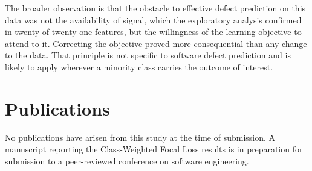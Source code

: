 \documentclass[12pt,a4paper,oneside]{report}
\begin{document}
The broader observation is that the obstacle to effective defect prediction on this data was not the availability of signal, which the exploratory analysis confirmed in twenty of twenty-one features, but the willingness of the learning objective to attend to it. Correcting the objective proved more consequential than any change to the data. That principle is not specific to software defect prediction and is likely to apply wherever a minority class carries the outcome of interest.

\clearpage

\chapter*{Publications}

No publications have arisen from this study at the time of submission. A manuscript reporting the Class-Weighted Focal Loss results is in preparation for submission to a peer-reviewed conference on software engineering.

\clearpage

\renewcommand{\bibname}{References}
\clearpage
{}
\end{document}
